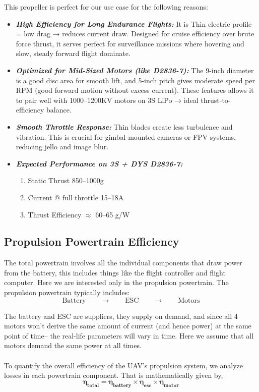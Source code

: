 \documentclass[12pt]{report}
\begin{document}
      This propeller is perfect for our use case for the following reasons:

      \begin{itemize}
        \item \textbf{\textit{High Efficiency for Long Endurance Flights:}} It is Thin electric profile = low drag → reduces current draw. Designed for cruise efficiency over brute force thrust, it serves perfect for surveillance missions where hovering and slow, steady forward flight dominate.
        \item \textbf{\textit{Optimized for Mid-Sized Motors (like D2836-7):}} The 9-inch diameter is a good disc area for smooth lift, and 5-inch pitch gives moderate speed per RPM (good forward motion without excess current). These features allows it to pair well with 1000–1200KV motors on 3S LiPo → ideal thrust-to-efficiency balance.
        \item \textbf{\textit{Smooth Throttle Response:}} Thin blades create less turbulence and vibration. This is crucial for gimbal-mounted cameras or FPV systems, reducing jello and image blur.
        \item \textbf{\textit{Expected Performance on 3S + DYS D2836-7:}} 
          \begin{enumerate}
            \item Static Thrust \hfill 850--1000g
            \item Current @ full throttle \hfill 15--18A
            \item Thrust Efficiency \hfill $\approx$ 60--65 g/W
          \end{enumerate}
      \end{itemize}
      
      \subsection{Propulsion Powertrain Efficiency}
      The total powertrain involves all the individual components that draw power from the battery, this includes things like the flight controller and flight computer. Here we are interested only in the propulsion powertrain. The propulsion powertrain typically includes: \[ \text{Battery} \quad \quad \rightarrow \quad \quad  \text{ESC} \quad \quad \rightarrow \quad \quad \text{Motors} \]

      The battery and ESC are suppliers, they supply on demand, and since all 4 motors won't derive the same amount of current (and hence power) at the same point of time-- the real-life parameters will vary in time. Here we assume that all motors demand the same power at all times.\\ \\ To quantify the overall efficiency of the UAV’s propulsion system, we analyze losses in each powertrain component. That is mathematically given by, 
      \[ 
      \boldsymbol{\eta_{total} = \eta_{battery} \times \eta_{esc} \times \eta_{motor}}
      \]
\end{document}
